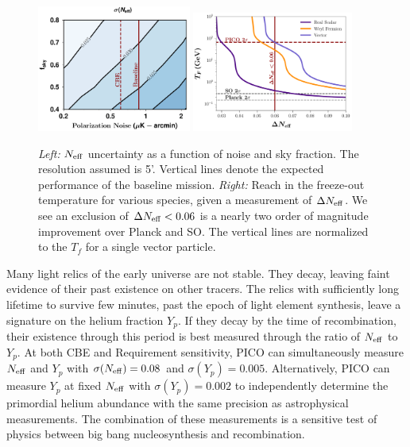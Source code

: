 \documentclass[PICOReport.tex]{subfiles}
\begin{document}
\begin{figure}[t!]
\begin{center}
\includegraphics[width=0.45\textwidth]{images/Neff_final.pdf}
\includegraphics[width=0.47\textwidth]{images/Tf_pico.pdf}
\vspace{-0.15in}
\caption{ \small \setlength{\baselineskip}{0.95\baselineskip}
\textit{Left:} ${N_{\rm eff}}$ uncertainty as a function of noise and sky fraction. The resolution assumed is 5'.   Vertical lines denote the expected performance of the baseline mission. \textit{Right:} Reach in the freeze-out temperature for various species, given a measurement of $\Delta {N_{\rm eff}}$.  We see an exclusion of $\Delta {N_{\rm eff}} < 0.06$ is a nearly two order of magnitude improvement over Planck and SO.  The vertical lines are normalized to the $T_f$ for a single vector particle.
\label{fig:Neff_future}}
\end{center}
\vspace{-0.15in}
\end{figure}

Many light relics of the early universe are not stable. They decay, leaving faint evidence of their past existence on other tracers. The relics with sufficiently long lifetime to survive few minutes, past the epoch of light element synthesis, leave a signature on the helium fraction $Y_p$.  If they decay by the time of recombination, their existence through this period is best measured through the ratio of ${N_{\rm eff}}$ to $Y_p$. At both CBE and Requirement sensitivity, PICO can simultaneously measure ${N_{\rm eff}}$ and $Y_p$ with $\sigma({N_{\rm eff}}) = 0.08$ and $\sigma(Y_p) =0.005$.  Alternatively, PICO can measure $Y_p$ at fixed ${N_{\rm eff}}$ with $\sigma(Y_p) =0.002$ to independently determine the primordial helium abundance with the same precision as astrophysical measurements.  The combination of these measurements is a sensitive test of physics between big bang nucleosynthesis and recombination.  
\end{document}
